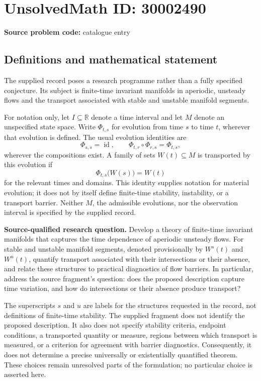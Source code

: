 \documentclass[11pt]{article}
\newcommand{\R}{\mathbb{R}}
\begin{document}
\section*{UnsolvedMath ID: 30002490}
\textbf{Source problem code:} catalogue entry
\subsection{Definitions and mathematical statement}
The supplied record poses a research programme rather than a fully specified conjecture. Its subject is finite-time invariant manifolds in aperiodic, unsteady flows and the transport associated with stable and unstable manifold segments.

For notation only, let \(I\subseteq\R\) denote a time interval and let \(M\) denote an unspecified state space. Write \(\Phi_{t,s}\) for evolution from time \(s\) to time \(t\), wherever that evolution is defined. The usual evolution identities are
\[
\Phi_{s,s}=\operatorname{id},\qquad
\Phi_{t,r}\circ\Phi_{r,s}=\Phi_{t,s},
\]
wherever the compositions exist. A family of sets \(W(t)\subseteq M\) is transported by this evolution if
\[
\Phi_{t,s}\bigl(W(s)\bigr)=W(t)
\]
for the relevant times and domains. This identity supplies notation for material evolution; it does not by itself define finite-time stability, instability, or a transport barrier. Neither \(M\), the admissible evolutions, nor the observation interval is specified by the supplied record.

\textbf{Source-qualified research question.} Develop a theory of finite-time invariant manifolds that captures the time dependence of aperiodic unsteady flows. For stable and unstable manifold segments, denoted provisionally by \(W^s(t)\) and \(W^u(t)\), quantify transport associated with their intersections or their absence, and relate these structures to practical diagnostics of flow barriers. In particular, address the source fragment's question: does the proposed description capture time variation, and how do intersections or their absence produce transport?

The superscripts \(s\) and \(u\) are labels for the structures requested in the record, not definitions of finite-time stability. The supplied fragment does not identify the proposed description. It also does not specify stability criteria, endpoint conditions, a transported quantity or measure, regions between which transport is measured, or a criterion for agreement with barrier diagnostics. Consequently, it does not determine a precise universally or existentially quantified theorem. These choices remain unresolved parts of the formulation; no particular choice is asserted here.
\end{document}

